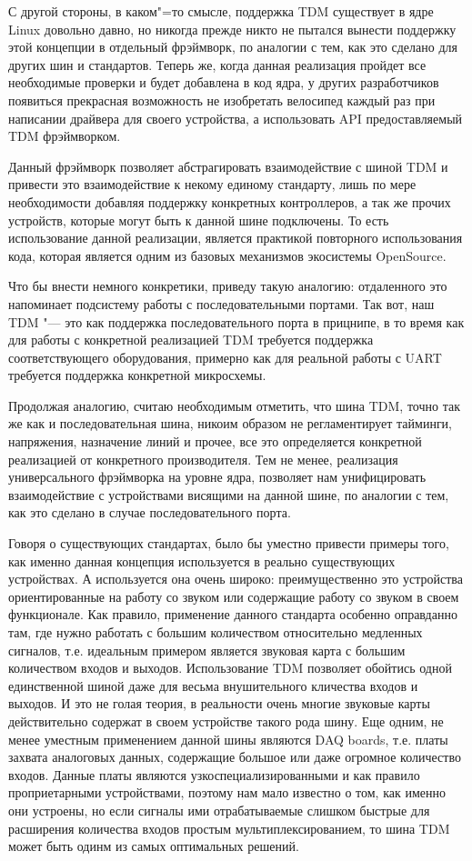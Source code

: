 \documentclass[10pt, a5paper]{article}
\begin{document}
С другой стороны, в каком"=то смысле, поддержка TDM существует в ядре Linux
довольно давно, но никогда прежде никто не пытался вынести поддержку этой
концепции в отдельный фрэймворк, по аналогии с тем, как это сделано для
других шин и стандартов. Теперь же, когда данная реализация пройдет все
необходимые проверки и будет добавлена в код ядра, у других разработчиков
появиться прекрасная возможность не изобретать велосипед каждый раз при
написании драйвера для своего устройства, а использовать API
предоставляемый TDM фрэймворком.

Данный фрэймворк позволяет абстрагировать взаимодействие с шиной TDM и
привести это взаимодействие к некому единому стандарту, лишь по мере
необходимости добавляя поддержку конкретных контроллеров, а так же прочих
устройств, которые могут быть к данной шине подключены. То есть
использование данной реализации, является практикой повторного
использования кода, которая является одним из базовых механизмов
экосистемы OpenSource.

Что бы внести немного конкретики, приведу такую аналогию: отдаленного это
напоминает подсистему работы с последовательными портами. Так вот, наш TDM
"--- это как поддержка последовательного порта в прицнипе, в то время как для
работы с конкретной реализацией TDM требуется поддержка соответствующего
оборудования, примерно как для реальной работы с UART требуется поддержка
конкретной микросхемы.

Продолжая аналогию, считаю необходимым отметить, что шина TDM, точно так
же как и последовательная шина, никоим образом не регламентирует тайминги,
напряжения, назначение линий и прочее, все это определяется конкретной
реализацией от конкретного производителя. Тем не менее, реализация
универсального фрэймворка на уровне ядра, позволяет нам унифицировать
взаимодействие с устройствами висящими на данной шине, по аналогии с тем,
как это сделано в случае последовательного порта.

Говоря о существующих стандартах, было бы уместно привести примеры того,
как именно данная концепция используется в реально существующих
устройствах. А используется она очень широко: преимущественно это
устройства ориентированные на работу со звуком или содержащие работу со
звуком в своем функционале. Как правило, применение данного стандарта
особенно оправданно там, где нужно работать с большим количеством
относительно медленных сигналов, т.е. идеальным примером является звуковая
карта с большим количеством входов и выходов. Использование TDM позволяет
обойтись одной единственной шиной даже для весьма внушительного кличества
входов и выходов. И это не голая теория, в реальности очень многие
звуковые карты действительно содержат в своем устройстве такого рода шину.
Еще одним, не менее уместным применением данной шины являются DAQ boards,
т.е. платы захвата аналоговых данных, содержащие большое или даже огромное
количество входов. Данные платы являются узкоспециализированными и как
правило проприетарными устройствами, поэтому нам мало известно о том, как
именно они устроены, но если сигналы ими отрабатываемые слишком быстрые
для расширения количества входов простым мультиплексированием, то шина TDM
может быть одинм из самых оптимальных решений.
\end{document}
